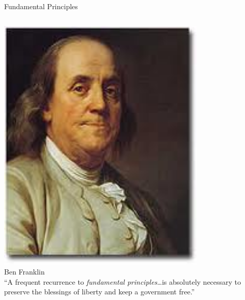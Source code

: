 \documentclass{beamer}
\begin{document}
\begin{frame}{Fundamental Principles}
    \begin{columns}[onlytextwidth]
            \centering
            \includegraphics[width=0.75\textwidth]{img/ben-franklin.png} \\
            Ben Franklin \\

            ``A frequent recurrence to \emph{fundamental principles}\ldots is absolutely necessary to preserve the blessings of liberty and keep a government free.''
    \end{columns}
\end{frame}
\end{document}
